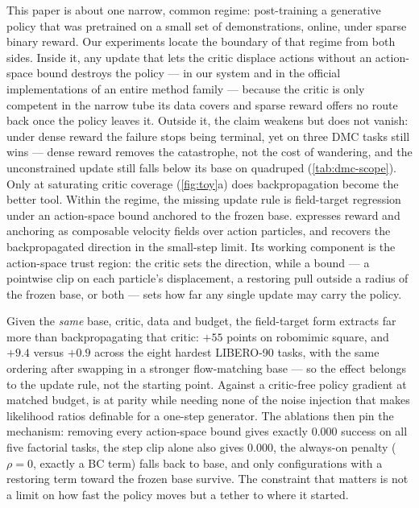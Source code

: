 This paper is about one narrow, common regime: post-training a generative
policy that was pretrained on a small set of demonstrations, online, under
sparse binary reward. Our experiments locate the boundary of that regime
from both sides. Inside it, any update that lets the critic displace actions
without an action-space bound destroys the policy --- in our system and in
the official implementations of an entire method family --- because the
critic is only competent in the narrow tube its data covers and sparse
reward offers no route back once the policy leaves it. Outside it, the claim weakens but does not vanish: under dense reward the
failure stops being terminal, yet on three DMC tasks \method{} still wins
--- dense reward removes the catastrophe, not the cost of wandering, and
the unconstrained update still falls below its base on quadruped
(\cref{tab:dmc-scope}). Only at saturating critic coverage
(\cref{fig:toy}a) does backpropagation become the better tool. Within the regime, the
missing update rule is field-target regression under an action-space bound
anchored to the frozen base. \method{} expresses reward and anchoring as composable velocity fields over
action particles, and recovers the backpropagated direction in the
small-step limit. Its working component is the action-space trust region:
the critic sets the direction, while a bound --- a pointwise clip on each
particle's displacement, a restoring pull outside a radius of the frozen
base, or both --- sets how far any single update may carry the policy.

Given the \emph{same} base, critic, data and budget, the field-target form
extracts far more than backpropagating that critic: $+55$ points on
robomimic square, and $+9.4$ versus $+0.9$ across the eight hardest
LIBERO-90 tasks, with the same ordering after swapping in a stronger
flow-matching base --- so the effect belongs to the update rule, not the
starting point. Against a critic-free policy gradient at matched budget,
\method{} is at parity while needing none of the noise injection that makes
likelihood ratios definable for a one-step generator. The ablations then
pin the mechanism: removing every action-space bound gives exactly $0.000$
success on all five factorial tasks, the step clip alone also gives
$0.000$, the always-on penalty ($\rho{=}0$, exactly a BC term) falls back
to base, and only configurations with a restoring term toward the frozen
base survive. The constraint that matters is not a limit on how fast the
policy moves but a tether to where it started.

